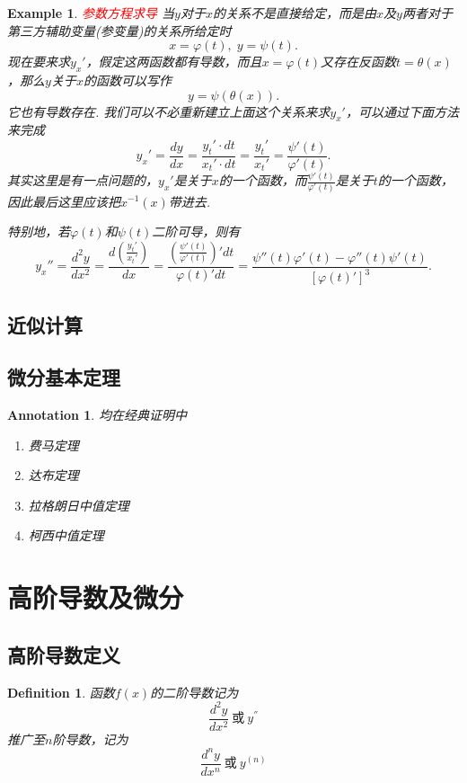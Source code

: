 \documentclass{article}
\newtheorem{example}[theorem]{Example}
\newtheorem{definition}[theorem]{Definition}
\newtheorem{annotation}[theorem]{Annotation}
\newcommand{\redt}[1]{\textcolor{red}{#1}}
\begin{document}
\begin{example}
\rm \redt{参数方程求导} 当$y$对于$x$的关系不是直接给定，而是由$x$及$y$两者对于第三方辅助变量(参变量)的关系所给定时
$$
x = \varphi(t), \; y=\psi(t).
$$
现在要来求$y_x'$，假定这两函数都有导数，而且$x=\varphi(t)$又存在反函数$t = \theta(x)$，那么$y$关于$x$的函数可以写作
$$
y = \psi(\theta(x)).
$$
它也有导数存在. 我们可以不必重新建立上面这个关系来求$y_x'$，可以通过下面方法来完成
$$
y_x' = \frac{dy}{dx} = \frac{y_t' \cdot dt}{x_t' \cdot dt} = \frac{y_t'}{x_t'} = \frac{\psi'(t)
}{\varphi'(t)}. 
$$
其实这里是有一点问题的，$y_x'$是关于$x$的一个函数，而$\frac{\psi'(t)}{\varphi'(t)}$是关于$t$的一个函数，因此最后这里应该把$x^{-1}(x)$带进去. 

特别地，若$\varphi(t)$和$\psi(t)$二阶可导，则有
$$
y_x'' = \frac{d^2y}{dx^2}  = \frac{d\left(\frac{y_t'}{x_t'}\right)}{dx} = \frac{\left(\frac{\psi'(t)
}{\varphi'(t)}\right)'dt}{\varphi(t)'dt} = \frac{\psi''(t)\varphi'(t)-\varphi''(t)\psi'(t)}{[\varphi(t)']^3}.
$$
\end{example}



\subsection{近似计算}


\subsection{微分基本定理}

\begin{annotation}
\rm 均在经典证明中
\begin{enumerate}
	\item 费马定理
	\item 达布定理
	\item 拉格朗日中值定理
	\item 柯西中值定理
\end{enumerate}
\end{annotation}

\newpage
\section{高阶导数及微分}

\subsection{高阶导数定义}
\begin{definition}
\rm 函数$f(x)$的{\color{red}二阶导数}记为
$$
\frac{d^2y}{dx^2}~\text{或}~ y^{''}
$$
推广至$n$阶导数，记为
$$
\frac{d^ny}{dx^n}~\text{或}~ y^{(n)}
$$
\end{definition}
\end{document}
